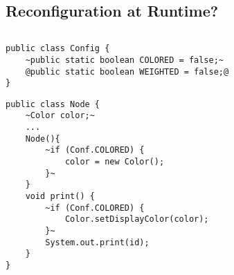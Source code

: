\subsection{Reconfiguration at Runtime?}
\begin{frame}[fragile]{\insertsubsection}
		\begin{columns}
\begin{tiny}
\begin{lstlisting}
public class Config {
	~public static boolean COLORED = false;~
	@public static boolean WEIGHTED = false;@
}

\end{lstlisting}
\begin{lstlisting}
public class Node {
	~Color color;~
	...
	Node(){
		~if (Conf.COLORED) { 
			color = new Color(); 
		}~
	}
	void print() {
		~if (Conf.COLORED) { 
			Color.setDisplayColor(color); 
		}~
		System.out.print(id);
	}
}
\end{lstlisting}
\end{tiny}	
		\end{columns}
\end{frame}

